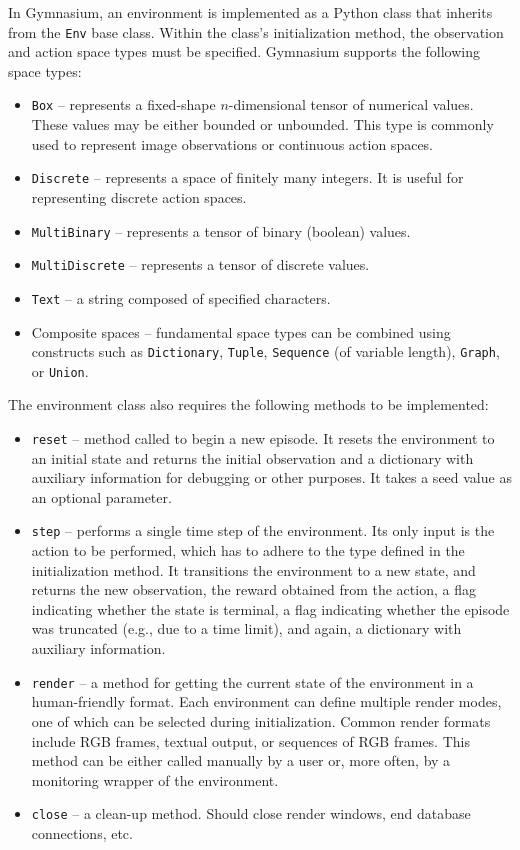 \documentclass[
  digital,     %
  oneside,     %
  nosansbold,  %
  nocolorbold, %
  lof,         %
  lot,         %
]{fithesis4}
\begin{document}
In Gymnasium, an environment is implemented as a Python class that inherits from the \texttt{Env} base class. Within the class's initialization method, the observation and action space types must be specified. Gymnasium supports the following space types:

\begin{itemize}
    \item \texttt{Box} -- represents a fixed-shape $n$-dimensional tensor of numerical values. These values may be either bounded or unbounded. This type is commonly used to represent image observations or continuous action spaces.
    \item \texttt{Discrete} -- represents a space of finitely many integers. It is useful for representing discrete action spaces.
    \item \texttt{MultiBinary} -- represents a tensor of binary (boolean) values.
    \item \texttt{MultiDiscrete} -- represents a tensor of discrete values.
    \item \texttt{Text} -- a string composed of specified characters.
    \item Composite spaces -- fundamental space types can be combined using constructs such as \texttt{Dictionary}, \texttt{Tuple}, \texttt{Sequence} (of variable length), \texttt{Graph}, or \texttt{Union}.
\end{itemize}

The environment class also requires the following methods to be implemented:

\begin{itemize}
    \item \texttt{reset} -- method called to begin a new episode. It resets the environment to an initial state and returns the initial observation and a dictionary with auxiliary information for debugging or other purposes. It takes a seed value as an optional parameter.
    \item \texttt{step} -- performs a single time step of the environment. Its only input is the action to be performed, which has to adhere to the type defined in the initialization method. It transitions the environment to a new state, and returns the new observation, the reward obtained from the action, a flag indicating whether the state is terminal, a flag indicating whether the episode was truncated (e.g., due to a time limit), and again, a dictionary with auxiliary information.
    \item \texttt{render} -- a method for getting the current state of the environment in a human-friendly format. Each environment can define multiple render modes, one of which can be selected during initialization. Common render formats include RGB frames, textual output, or sequences of RGB frames. This method can be either called manually by a user or, more often, by a monitoring wrapper of the environment.
    \item \texttt{close} -- a clean-up method. Should close render windows, end database connections, etc.
\end{itemize}
\end{document}
